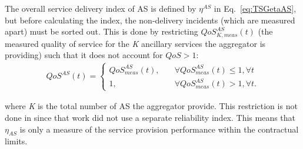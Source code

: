 
The overall service delivery index of AS is defined by $\eta^{AS}$ in Eq.~\eqref{eq:TSGetaAS}, but before calculating the index, the non-delivery incidents (which are measured apart) must be sorted out. This is done by restricting $QoS_{K,meas}^{AS}(t)$ (the measured quality of service for the \emph{K} ancillary services the aggregator is providing) such that it does not account for $QoS > 1$: 
\begin{align}
	QoS^{AS}(t) = \begin{cases} QoS^{AS}_{meas}(t) ,\quad &\forall QoS^{AS}_{meas}(t) \leq 1, \forall t\\
	1, \quad &\forall QoS^{AS}_{meas}(t) > 1, \forall t.
	\end{cases}
\end{align}

where \emph{K} is the total number of AS the aggregator provide.
This restriction is not done in \cite{bondy2014performance} since that work did not use a separate reliability index. This means that $\eta_{AS}$ is only a measure of the service provision performance within the contractual limits.

